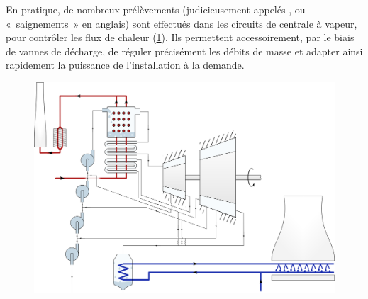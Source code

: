 		\clearfloats
		En pratique, de nombreux prélèvements (judicieusement appelés , ou «~saignements~» en anglais) sont effectués dans les circuits de centrale à vapeur, pour contrôler les flux de chaleur (\cref{fig_grosse_centrale_vapeur}). Ils permettent accessoirement, par le biais de vannes de décharge, de réguler précisément les débits de masse et adapter ainsi rapidement la puissance de l’installation à la demande.

		\begin{landscape}
		\begin{figure}
		 	\begin{center}
		 			\onlyframabook{\vspace{-1.5cm}}%
		 			\onlyamphibook{\vspace{-3.5cm}}%
				\centerline{\includegraphics[width=20cm]{images/circuit_complet.png}}
			\end{center}
			\label{fig_grosse_centrale_vapeur}
		\end{figure}
		\end{landscape}
